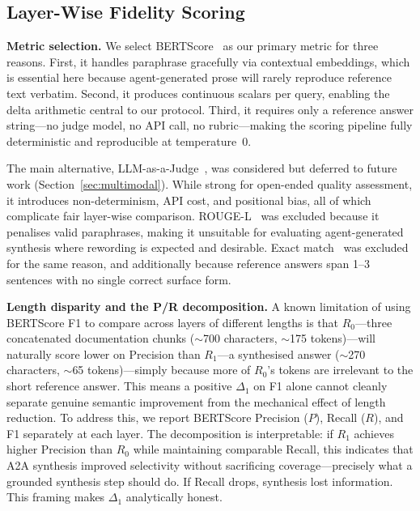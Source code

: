 \documentclass[10pt,journal,compsoc]{IEEEtran}
\begin{document}
\subsection{Layer-Wise Fidelity Scoring}
\label{sec:scoring}

\noindent\textbf{Metric selection.}
We select BERTScore~\cite{zhang2020bertscore} as our primary metric for three
reasons. First, it handles paraphrase gracefully via contextual embeddings, which
is essential here because agent-generated prose will rarely reproduce reference
text verbatim. Second, it produces continuous scalars per query, enabling the delta
arithmetic central to our protocol. Third, it requires only a reference answer
string---no judge model, no API call, no rubric---making the scoring pipeline fully
deterministic and reproducible at temperature~0.

The main alternative, LLM-as-a-Judge~\cite{zheng2023llmjudge}, was considered but
deferred to future work (Section~\ref{sec:multimodal}). While strong for
open-ended quality assessment, it introduces non-determinism, API cost, and
positional bias, all of which complicate fair layer-wise comparison.
ROUGE-L~\cite{lin2004rouge} was excluded because it penalises valid paraphrases,
making it unsuitable for evaluating agent-generated synthesis where rewording is
expected and desirable. Exact match~\cite{rajpurkar2016squad} was excluded for the
same reason, and additionally because reference answers span 1--3 sentences with
no single correct surface form.

\noindent\textbf{Length disparity and the P/R decomposition.}
A known limitation of using BERTScore F1 to compare across layers of different
lengths is that $R_0$---three concatenated documentation chunks ($\sim$700
characters, $\sim$175 tokens)---will naturally score lower on Precision than
$R_1$---a synthesised answer ($\sim$270 characters, $\sim$65 tokens)---simply
because more of $R_0$'s tokens are
irrelevant to the short reference answer. This means a positive $\Delta_1$ on F1
alone cannot cleanly separate genuine semantic improvement from the mechanical
effect of length reduction. To address this, we report BERTScore Precision ($P$),
Recall ($R$), and F1 separately at each layer. The decomposition is interpretable:
if $R_1$ achieves higher Precision than $R_0$ while maintaining comparable Recall,
this indicates that A2A synthesis improved selectivity without sacrificing
coverage---precisely what a grounded synthesis step should do. If Recall drops,
synthesis lost information. This framing makes $\Delta_1$ analytically honest.
\end{document}
